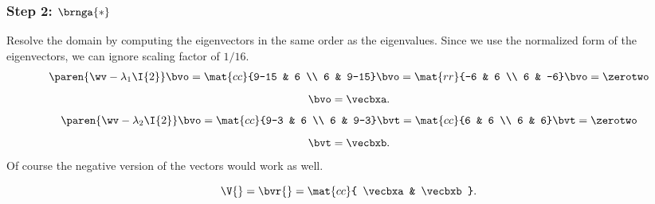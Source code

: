 \subsubsection{Step 2: $\brnga{*}$}
Resolve the domain by computing the eigenvectors in the same order as the eigenvalues. Since we use the normalized form of the eigenvectors, we can ignore scaling factor of $1/16$.
\begin{equation}
  \begin{split}
    \paren{\wv - \lambda_{1}\I{2}}\bvo = \mat{cc}{9-15 & 6 \\ 6 & 9-15}\bvo = \mat{rr}{-6 & 6 \\ 6 & -6}\bvo = \zerotwo
  \end{split}
\end{equation}
\begin{equation}
  \bvo = \vecbxa.
\end{equation}
%
\begin{equation}
  \begin{split}
    \paren{\wv - \lambda_{2}\I{2}}\bvo = \mat{cc}{9-3 & 6 \\ 6 & 9-3}\bvt = \mat{cc}{6 & 6 \\ 6 & 6}\bvt = \zerotwo
  \end{split}
\end{equation}
\begin{equation}
  \bvt = \vecbxb.
\end{equation}
Of course the negative version of the vectors would work as well.

\begin{equation}
  \V{} = \bvr{} = \mat{cc}{ \vecbxa & \vecbxb }.
  \label{eq:b:v}
\end{equation}


